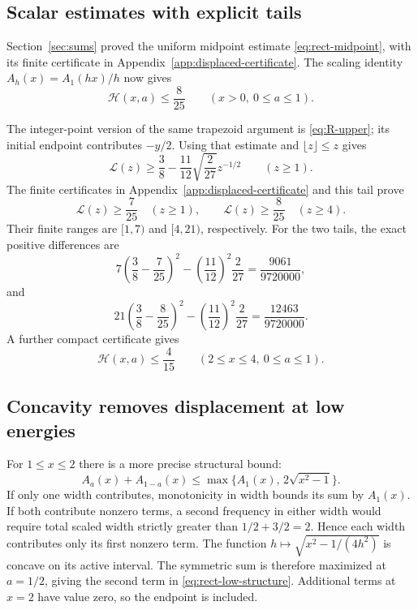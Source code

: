 \documentclass[11pt,reqno]{amsart}
\numberwithin{equation}{section}
\begin{document}
\subsection*{Scalar estimates with explicit tails}

Section~\ref{sec:sums} proved the uniform midpoint estimate
\eqref{eq:rect-midpoint}, with its finite certificate in
Appendix~\ref{app:displaced-certificate}.
The scaling identity $A_h(x)=A_1(hx)/h$ now gives
\begin{equation}\label{eq:rect-H-global}
 \mathcal H(x,a)\le\frac8{25}\qquad(x>0,\ 0\le a\le1).
\end{equation}

The integer-point version of the same trapezoid argument is
\eqref{eq:R-upper}; its initial endpoint contributes $-y/2$.
Using that estimate and $\lfloor z\rfloor\le z$ gives
\begin{equation}\label{eq:rect-L-tail}
 \mathcal L(z)\ge\frac38-\frac{11}{12}\sqrt{\frac2{27}}z^{-1/2}
 \qquad(z\ge1).
\end{equation}
The finite certificates in Appendix~\ref{app:displaced-certificate}
and this tail prove
\begin{equation}\label{eq:rect-L-bounds}
 \mathcal L(z)\ge\frac7{25}\quad(z\ge1),\qquad
 \mathcal L(z)\ge\frac8{25}\quad(z\ge4).
\end{equation}
Their finite ranges are $[1,7)$ and $[4,21)$, respectively.
For the two tails, the exact positive differences are
\[
 7\left(\frac38-\frac7{25}\right)^2
 -\left(\frac{11}{12}\right)^2\frac2{27}
 =\frac{9061}{9720000},
\]
and
\[
 21\left(\frac38-\frac8{25}\right)^2
 -\left(\frac{11}{12}\right)^2\frac2{27}
 =\frac{12463}{9720000}.
\]
A further compact certificate gives
\begin{equation}\label{eq:rect-H-middle}
 \mathcal H(x,a)\le\frac4{15}
 \qquad(2\le x\le4,\ 0\le a\le1).
\end{equation}

\subsection*{Concavity removes displacement at low energies}

For $1\le x\le2$ there is a more precise structural bound:
\begin{equation}\label{eq:rect-low-structure}
 A_a(x)+A_{1-a}(x)
 \le\max\{A_1(x),\,2\sqrt{x^2-1}\}.
\end{equation}
If only one width contributes, monotonicity in width bounds its
sum by $A_1(x)$. If both contribute nonzero terms, a second
frequency in either width would require total scaled width
strictly greater than $1/2+3/2=2$. Hence each width contributes
only its first nonzero term. The function
$h\mapsto\sqrt{x^2-1/(4h^2)}$ is concave on its active
interval. The symmetric sum is therefore maximized at
$a=1/2$, giving the second term in
\eqref{eq:rect-low-structure}. Additional terms at $x=2$ have
value zero, so the endpoint is included.
\end{document}
